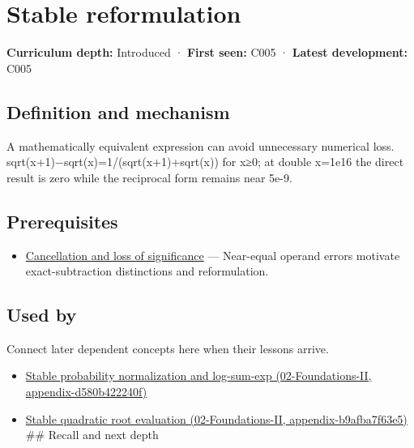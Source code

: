 \hypertarget{appendix-d7f8ba961670}{}
\section{Stable reformulation}\label{appendix-d7f8ba961670-stable-reformulation}

\textbf{Curriculum depth:} Introduced · \textbf{First seen:} C005 · \textbf{Latest development:} C005

\subsection{Definition and mechanism}\label{appendix-d7f8ba961670-definition-and-mechanism}

A mathematically equivalent expression can avoid unnecessary numerical loss. sqrt(x+1)−sqrt(x)=1/(sqrt(x+1)+sqrt(x)) for x≥0; at double x=1e16 the direct result is zero while the reciprocal form remains near 5e-9.

\subsection{Prerequisites}\label{appendix-d7f8ba961670-prerequisites}

\begin{itemize}
\tightlist
\item
  \hyperref[appendix-a2773a6a2f9d]{Cancellation and loss of significance} --- Near-equal operand errors motivate exact-subtraction distinctions and reformulation.
\end{itemize}

\subsection{Used by}\label{appendix-d7f8ba961670-used-by}

Connect later dependent concepts here when their lessons arrive.

\begin{itemize}
\tightlist
\item
  \href{../02-Foundations-II/main.pdf\#nameddest=appendix-d580b422240f}{Stable probability normalization and log-sum-exp (02-Foundations-II, appendix-d580b422240f)}
\item
  \href{../02-Foundations-II/main.pdf\#nameddest=appendix-b9afba7f63e5}{Stable quadratic root evaluation (02-Foundations-II, appendix-b9afba7f63e5)} \#\# Recall and next depth
\end{itemize}

